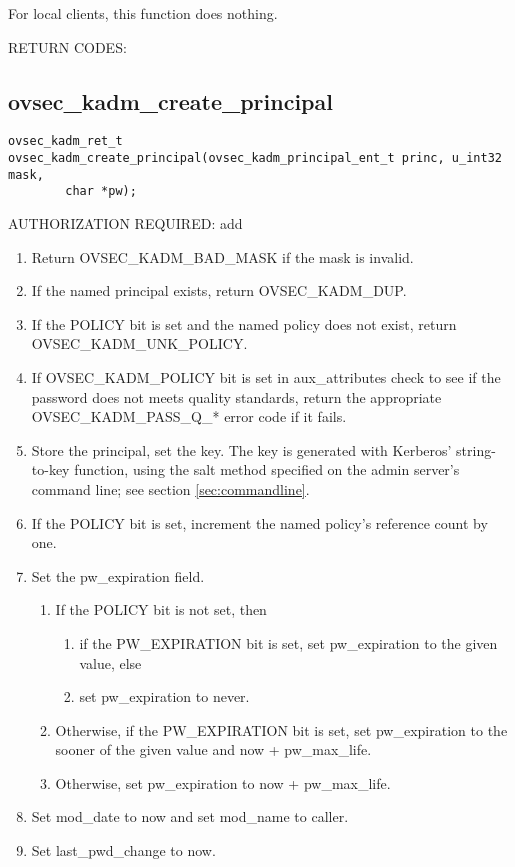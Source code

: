 For local clients, this function does nothing.

RETURN CODES:

\subsection{ovsec_kadm_create_principal}

\begin{verbatim}
ovsec_kadm_ret_t
ovsec_kadm_create_principal(ovsec_kadm_principal_ent_t princ, u_int32 mask,
		char *pw);
\end{verbatim}

AUTHORIZATION REQUIRED: add

\begin{enumerate}

\item Return OVSEC_KADM_BAD_MASK if the mask is invalid.
\item If the named principal exists, return OVSEC_KADM_DUP.
\item If the POLICY bit is set and the named policy does not exist,
return OVSEC_KADM_UNK_POLICY.
\item If OVSEC_KADM_POLICY bit is set in aux_attributes check to see if
the password does not meets quality standards, return the appropriate
OVSEC_KADM_PASS_Q_* error code if it fails.
\item Store the principal, set the key.  The key is generated with
Kerberos' string-to-key function, using the salt method specified on
the admin server's command line; see section \ref{sec:commandline}.
\item If the POLICY bit is set, increment the named policy's reference
count by one.

\item Set the pw_expiration field.
\begin{enumerate}
\item If the POLICY bit is not set, then
\begin{enumerate}
\item if the PW_EXPIRATION bit is set, set pw_expiration to the given
value, else
\item set pw_expiration to never.
\end{enumerate}
\item Otherwise, if the PW_EXPIRATION bit is set, set pw_expiration to
the sooner of the given value and now + pw_max_life.
\item Otherwise, set pw_expiration to now + pw_max_life.
\end{enumerate}

\item Set mod_date to now and set mod_name to caller.
\item Set last_pwd_change to now.
\end{enumerate}


